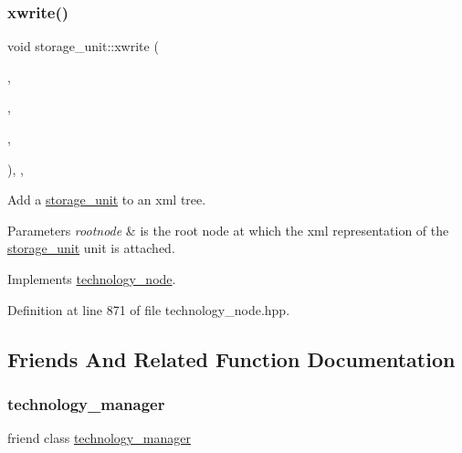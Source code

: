 \subsubsection{\texorpdfstring{xwrite()}{xwrite()}}
{\footnotesize\ttfamily void storage\+\_\+unit\+::xwrite (\begin{DoxyParamCaption}\item[{\hyperlink{classxml__element}{xml\+\_\+element} $\ast$}]{,  }\item[{const \hyperlink{technology__node_8hpp_a33dd193b7bd6b987bf0d8a770a819fa7}{technology\+\_\+node\+Ref}}]{,  }\item[{const \hyperlink{Parameter_8hpp_a37841774a6fcb479b597fdf8955eb4ea}{Parameter\+Const\+Ref}}]{,  }\item[{\hyperlink{target__device_8hpp_a476becc690220f0805ce73006449c732}{Target\+Device\+\_\+\+Type}}]{ }\end{DoxyParamCaption})\hspace{0.3cm}{\ttfamily [inline]}, {\ttfamily [override]}, {\ttfamily [virtual]}}



Add a \hyperlink{structstorage__unit}{storage\+\_\+unit} to an xml tree. 


\begin{DoxyParams}{Parameters}
{\em rootnode} & is the root node at which the xml representation of the \hyperlink{structstorage__unit}{storage\+\_\+unit} unit is attached. \\
\hline
\end{DoxyParams}


Implements \hyperlink{structtechnology__node_a8ce6644a0b2700f760936e4c02754e2f}{technology\+\_\+node}.



Definition at line 871 of file technology\+\_\+node.\+hpp.



\subsection{Friends And Related Function Documentation}
\mbox{\label{structstorage__unit_a7012231228df7578c7338a9773121f88}} 
\subsubsection{\texorpdfstring{technology\+\_\+manager}{technology\_manager}}
{\footnotesize\ttfamily friend class \hyperlink{classtechnology__manager}{technology\+\_\+manager}\hspace{0.3cm}{\ttfamily [friend]}}



